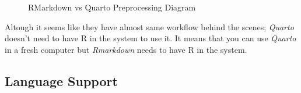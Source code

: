 \documentclass[
  letterpaper,
  DIV=11,
  numbers=noendperiod]{scrreprt}
\begin{document}
\begin{figure}

\begin{minipage}[t]{0.50\linewidth}

{\centering 


}

\end{minipage}%
%
\begin{minipage}[t]{0.50\linewidth}

{\centering 


}

\end{minipage}%

\caption{\label{fig-quarto-vs-rmarkdown}RMarkdown vs Quarto
Preprocessing Diagram}

\end{figure}

Altough it seems like they have almost same workflow behind the scenes;
\emph{Quarto} doesn't need to have R in the system to use it. It means
that you can use \emph{Quarto} in a fresh computer but \emph{Rmarkdown}
needs to have R in the system.

\hypertarget{language-support}{%
\subsection{Language Support}\label{language-support}}
\end{document}
